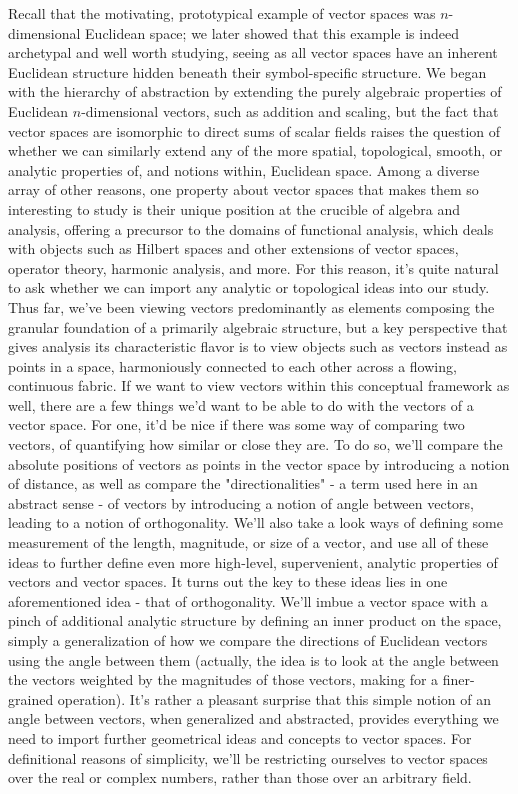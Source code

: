 \documentclass{article}
\newcommand{\nn}{\leavevmode \newline \newline}
\begin{document}
Recall that the motivating, prototypical example of vector spaces was $ n $-dimensional Euclidean space; we later showed that this example is indeed archetypal and well worth studying, seeing as all vector spaces have an inherent Euclidean structure hidden beneath their symbol-specific structure. We began with the hierarchy of abstraction by extending the purely algebraic properties of Euclidean $ n $-dimensional vectors, such as addition and scaling, but the fact that vector spaces are isomorphic to direct sums of scalar fields raises the question of whether we can similarly extend any of the more spatial, topological, smooth, or analytic properties of, and notions within, Euclidean space. Among a diverse array of other reasons, one property about vector spaces that makes them so interesting to study is their unique position at the crucible of algebra and analysis, offering a precursor to the domains of functional analysis, which deals with objects such as Hilbert spaces and other extensions of vector spaces, operator theory, harmonic analysis, and more. For this reason, it's quite natural to ask whether we can import any analytic or topological ideas into our study.
\nn
Thus far, we've been viewing vectors predominantly as elements composing the granular foundation of a primarily algebraic structure, but a key perspective that gives analysis its characteristic flavor is to view objects such as vectors instead as points in a space, harmoniously connected to each other across a flowing, continuous fabric. If we want to view vectors within this conceptual framework as well, there are a few things we'd want to be able to do with the vectors of a vector space. For one, it'd be nice if there was some way of comparing two vectors, of quantifying how similar or close they are. To do so, we'll compare the absolute positions of vectors as points in the vector space by introducing a notion of distance, as well as compare the "directionalities" - a term used here in an abstract sense - of vectors by introducing a notion of angle between vectors, leading to a notion of orthogonality. We'll also take a look ways of defining some measurement of the length, magnitude, or size of a vector, and use all of these ideas to further define even more high-level, supervenient, analytic properties of vectors and vector spaces.
\nn
It turns out the key to these ideas lies in one aforementioned idea - that of orthogonality. We'll imbue a vector space with a pinch of additional analytic structure by defining an inner product on the space, simply a generalization of how we compare the directions of Euclidean vectors using the angle between them (actually, the idea is to look at the angle between the vectors weighted by the magnitudes of those vectors, making for a finer-grained operation). It's rather a pleasant surprise that this simple notion of an angle between vectors, when generalized and abstracted, provides everything we need to import further geometrical ideas and concepts to vector spaces. For definitional reasons of simplicity, we'll be restricting ourselves to vector spaces over the real or complex numbers, rather than those over an arbitrary field.
\end{document}
